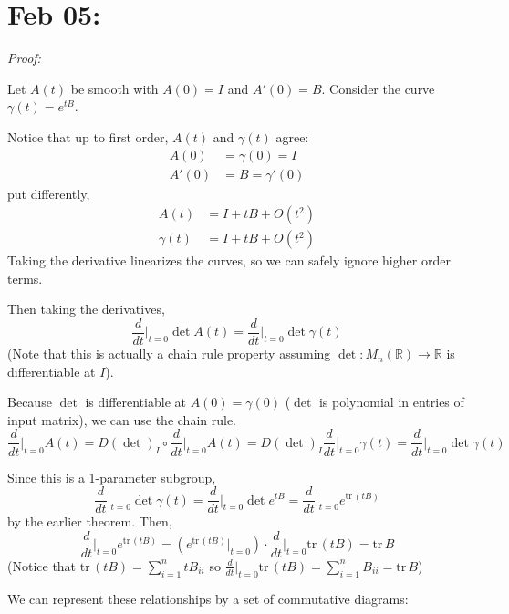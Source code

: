 \documentclass[12pt]{article}
\newcommand{\R}{\mathbb{R}}
\newcommand{\GL}{\text{GL}\,}
\newcommand{\tr}{\text{tr}\,}
\newenvironment*{tbox}[2][gray]{
    \begin{tcolorbox}[
        parbox=false,
        colback=#1!5!white,
        colframe=#1!75!black,
        breakable,
        title={#2}
    ]}
    {\end{tcolorbox}}
\begin{document}
\section{Feb 05:}
    \begin{tbox}{\textbf{Theorem:} Let $A(t)$ be a smooth family of matrices in $\GL(2, \R)$ and $A(0) = I$. Then 
        \[\frac{d}{dt}\bigg\vert_{t =0 } \det A(t) = \tr A'(0)\]}
        \emph{Proof:} 

        Let $A(t)$ be smooth with $A(0) = I$ and $A'(0) = B$. Consider the curve $\gamma(t) = e^{tB}$.

        Notice that up to first order, $A(t)$ and $\gamma(t)$ agree:
        \begin{align*}
            A(0) &= \gamma(0) = I\\ 
            A'(0) &= B = \gamma'(0)
        \end{align*} 
        put differently,
        \begin{align*}
            A(t) &= I + tB + O(t^2)\\ 
            \gamma(t) &= I + tB + O(t^2)
        \end{align*}
        Taking the derivative linearizes the curves, so we can safely ignore higher order terms. 

        Then taking the derivatives, 
        \[\frac{d}{dt}\bigg\vert_{t=0} \det A(t) = \frac{d}{dt}\bigg\vert_{t=0} \det \gamma(t)\]
        (Note that this is actually a chain rule property assuming $\det: M_n(\R) \to \R$ is differentiable at $I$). 

        Because $\det$ is differentiable at $A(0) = \gamma(0)$ ($\det$ is polynomial in entries of input matrix), we can use the chain rule. 
        \[\frac{d}{dt}\bigg\vert_{t=0} A(t) = D(\det)_{I} \circ \frac{d}{dt}\bigg\vert_{t=0} A(t) = D(\det)_I \frac{d}{dt}\bigg\vert_{t=0} \gamma(t) = \frac{d}{dt}\bigg\vert_{t=0} \det \gamma(t)\]

        Since this is a 1-parameter subgroup, 
        \[\frac{d}{dt}\bigg\vert_{t=0} \det \gamma(t) = \frac{d}{dt}\bigg\vert_{t=0} \det e^{tB} = \frac{d}{dt}\bigg\vert_{t=0} e^{\tr(tB)}\]
        by the earlier theorem. Then, 
        \[\frac{d}{dt}\bigg\vert_{t=0} e^{\tr(tB)} = (e^{\tr(tB)} \bigg\vert_{t=0}) \cdot \frac{d}{dt}\bigg\vert_{t=0} \tr(tB) = \tr B \]
        (Notice that $\tr(tB) = \sum_{i=1}^n tB_{ii}$ so $\frac{d}{dt}\bigg\vert_{t=0} \tr(tB) = \sum_{i=1}^n B_{ii} = \tr B$)
    \end{tbox}

    We can represent these relationships by a set of commutative diagrams:
    
\end{document}
